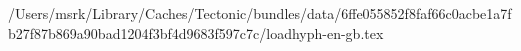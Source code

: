 /Users/msrk/Library/Caches/Tectonic/bundles/data/6ffe055852f8faf66c0acbe1a7fb27f87b869a90bad1204f3bf4d9683f597c7c/loadhyph-en-gb.tex